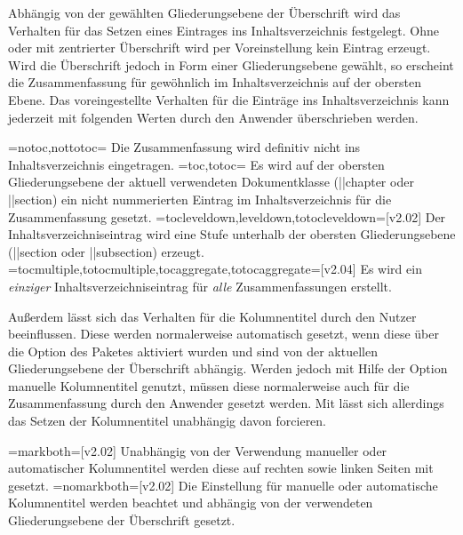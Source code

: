 \begin{DeclareEntity*}{}
\begin{DeclareEntity*}{}
\begin{DeclareEntity*}{}
\begin{Declaration}
Abhängig von der gewählten Gliederungsebene der Überschrift wird das Verhalten 
für das Setzen eines Eintrages ins Inhaltsverzeichnis festgelegt. Ohne oder mit 
zentrierter Überschrift wird per Voreinstellung kein Eintrag erzeugt. Wird die 
Überschrift jedoch in Form einer Gliederungsebene gewählt, so erscheint die 
Zusammenfassung für gewöhnlich im Inhaltsverzeichnis auf der obersten Ebene. 
Das voreingestellte Verhalten für die Einträge ins Inhaltsverzeichnis kann 
jederzeit mit folgenden Werten durch den Anwender überschrieben werden.%
%
\begin{DeclareValues}
\itemval=notoc,nottotoc=
  Die Zusammenfassung wird definitiv nicht ins Inhaltsverzeichnis eingetragen.
\itemval=toc,totoc=
  Es wird auf der obersten Gliederungsebene der aktuell verwendeten 
  Dokumentklasse (\Macro||{chapter} oder \Macro||{section}) ein nicht 
  nummerierten Eintrag im Inhaltsverzeichnis für die Zusammenfassung gesetzt.
\itemval=tocleveldown,leveldown,totocleveldown=[v2.02]
  Der Inhaltsverzeichniseintrag wird eine Stufe unterhalb der obersten 
  Gliederungsebene (\Macro||{section} oder \Macro||{subsection}) erzeugt.
\itemval=tocmultiple,totocmultiple,tocaggregate,totocaggregate=[v2.04]
  Es wird ein \emph{einziger} Inhaltsverzeichniseintrag für \emph{alle} 
  Zusammenfassungen erstellt.
\end{DeclareValues}

Außerdem lässt sich das Verhalten für die Kolumnentitel durch den Nutzer 
beeinflussen. Diese werden normalerweise automatisch gesetzt, wenn diese über 
die Option  des Paketes  aktiviert 
wurden und sind von der aktuellen Gliederungsebene der Überschrift abhängig. 
Werden jedoch mit Hilfe der Option  manuelle Kolumnentitel 
genutzt, müssen diese normalerweise auch für die Zusammenfassung durch den 
Anwender gesetzt werden. Mit  lässt sich allerdings 
das Setzen der Kolumnentitel unabhängig davon forcieren.%
%
\begin{DeclareValues}
\itemval=markboth=[v2.02]
  Unabhängig von der Verwendung manueller oder automatischer Kolumnentitel 
  werden diese auf rechten sowie linken Seiten mit  gesetzt.
\itemval=nomarkboth=[v2.02]
  Die Einstellung für manuelle oder automatische Kolumnentitel werden beachtet 
  und abhängig von der verwendeten Gliederungsebene der Überschrift gesetzt.
\end{DeclareValues}


\end{Declaration}
\end{DeclareEntity*}
\end{DeclareEntity*}
\end{DeclareEntity*}

